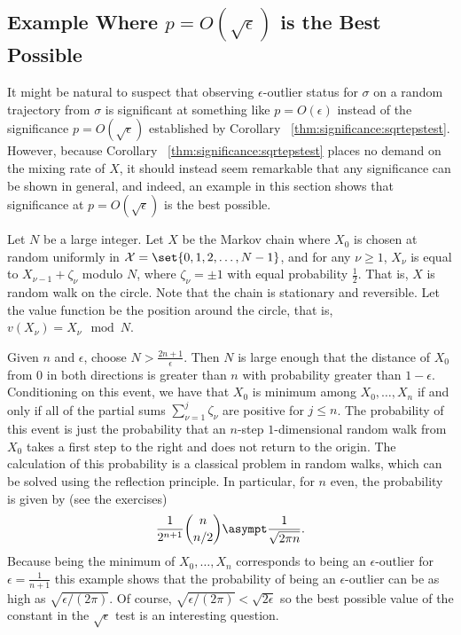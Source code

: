 \documentclass[12pt]{article}
\begin{document}
\subsection*{Example Where \( p = O(\sqrt{\epsilon}) \) is the Best
Possible}

It might be natural to suspect that observing \( \epsilon \)-outlier
status for \( \sigma \) on a random trajectory from \( \sigma \) is
significant at something like \( p = O(\epsilon) \) instead of the
significance \( p = O(\sqrt{\epsilon}) \) established by Corollary~%
\ref{thm:significance:sqrtepstest}.  However, because Corollary~%
\ref{thm:significance:sqrtepstest} places no demand on the mixing rate
of \( X \), it should instead seem remarkable that any significance can
be shown in general, and indeed, an example in this section shows that
significance at \( p = O( \sqrt{\epsilon}) \) is the best possible.

Let \( N \) be a large integer.  Let \( X \) be the Markov chain where \(
X_0 \) is chosen at random uniformly in \( \mathcal{X} = \set{0, 1, 2, \dots , N-1} \),
and for any \( \nu \ge 1 \), \( X_{\nu} \) is equal to \( X_{\nu-1} +
\zeta_{\nu} \) modulo \( N \), where \( \zeta_{\nu} = \pm 1 \) with
equal probability \( \frac{1}{2} \).  That is, \( X \) is random walk on
the circle.  Note that the chain is stationary and reversible.  Let the
value function be the position around the circle, that is, \(
v(X_{\nu}) = X_{\nu} \mod N \).

Given \( n \) and \( \epsilon \), choose \( N > \frac{2n+1}{\epsilon} \).
Then \( N \) is large enough that the distance of \( X_0 \) from \( 0 \)
in both directions is greater than \( n \) with probability greater
than \( 1 -
\epsilon \). Conditioning on this event, we have that \( X_0 \) is
minimum among \( X_0, \dots , X_n \) if and only if all of the partial
sums \( \sum\limits_{\nu=1}^ {j} \zeta_\nu \) are positive for \( j \le
n \).  The probability of this event is just the probability that an \( n
\)-step \( 1 \)-dimensional random walk from \( X_0 \) takes a first
step to the right and does not return to the origin.  The calculation of
this probability is a classical problem in random walks, which can be
solved using the reflection principle.  In particular, for \( n \) even,
the probability is given by (see the exercises) 
\[
    \frac{1}{2^{n+1}}\binom{n}{n/2} \asympt \frac{1}{\sqrt{2 \pi n}}.
\] Because being the minimum of \( X_0, \dots , X_n \) corresponds to
being an \( \epsilon \)-outlier for \( \epsilon = \frac{1}{n+1} \) this
example shows that the probability of being an \( \epsilon \)-outlier
can be as high as \( \sqrt{\epsilon/(2\pi)} \).  Of course, \( \sqrt{\epsilon/
(2\pi)} < \sqrt{2\epsilon} \) so the best possible value of the constant
in the \( \sqrt{\epsilon} \) test is an interesting question.
\end{document}
